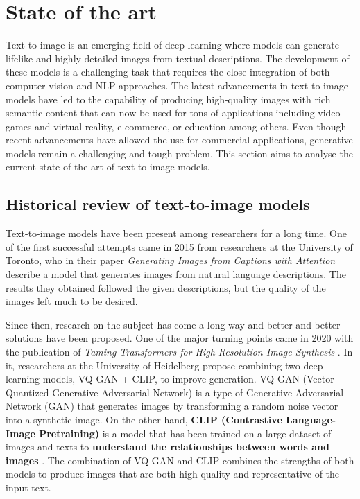\chapter{State of the art} \label{sec:stateofArt}

Text-to-image is an emerging field of deep learning where models can generate lifelike and highly detailed images from textual descriptions. The development of these models is a challenging task that requires the close integration of both computer vision and NLP approaches. The latest advancements in text-to-image models have led to the capability of producing high-quality images with rich semantic content that can now be used for tons of applications including video games and virtual reality, e-commerce, or education among others. Even though recent advancements have allowed the use for commercial applications, generative models remain a challenging and tough problem. This section aims to analyse the current state-of-the-art of text-to-image models.

\section{Historical review of text-to-image models} \label{Hreview}

Text-to-image models have been present among researchers for a long time. One of the first successful attempts came in 2015 from researchers at the University of Toronto, who in their paper \textit{Generating Images from Captions with Attention} \cite{mansimov2015generating} describe a model that generates images from natural language descriptions. The results they obtained followed the given descriptions, but the quality of the images left much to be desired. 

Since then, research on the subject has come a long way and better and better solutions have been proposed. One of the major turning points came in 2020 with the publication of \textit{Taming Transformers for High-Resolution Image Synthesis} \cite{esser2021taming}. In it, researchers at the University of Heidelberg propose combining two deep learning models, VQ-GAN + CLIP, to improve generation. VQ-GAN (Vector Quantized Generative Adversarial Network) is a type of Generative Adversarial Network (GAN) \cite{goodfellow2020generative} that generates images by transforming a random noise vector into a synthetic image. On the other hand, \textbf{CLIP (Contrastive Language-Image Pretraining)} is a model that has been trained on a large dataset of images and texts to \textbf{understand the relationships between words and images} \cite{radford2021learning}. The combination of VQ-GAN and CLIP combines the strengths of both models to produce images that are both high quality and representative of the input text. 

